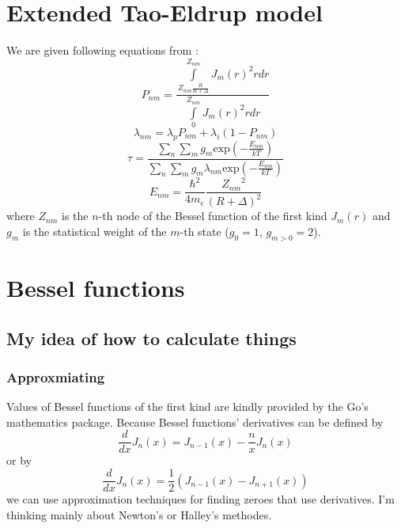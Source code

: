 \documentclass[a4paper]{article}
\begin{document}
	\section{Extended Tao-Eldrup model}
	We are given following equations from \cite{Zaleski2015}:
	\begin{equation}
		\label{eq1}
		P_{nm} = 
			\frac
				{\int\limits_{Z_{nm}\frac{R}{R+\Delta}}^{Z_{nm}}J_m(r)^2rdr}
				{\int\limits_0^{Z_{nm}}J_m(r)^2rdr}
	\end{equation}
	\begin{equation}
		\lambda_{nm} = \lambda_pP_{nm} + \lambda_i(1-P_{nm})
	\end{equation}
	\begin{equation}
		\tau =
			\frac
				{\sum\limits_n\sum\limits_mg_m\mathrm{exp}\left(-\frac{E_{nm}}{kT}\right)}
				{\sum\limits_n\sum\limits_mg_m\lambda_{nm}\mathrm{exp}\left(-\frac{E_{nm}}{kT}\right)}
	\end{equation}
	\begin{equation*}
		E_{nm} = \frac{\hbar^2}{4m_e}\frac{{Z_{nm}}^2}{(R+\Delta)^2}
	\end{equation*}
	where $Z_{nm}$ is the $n$-th node of the Bessel function of the
	first kind $J_m(r)$ and $g_m$ is the statistical weight of the $m$-th state
	($g_0 = 1$, $g_{m>0}=2$).
	\section{Bessel functions}
	\subsection{My idea of how to calculate things}
	\subsubsection{Approxmiating}
	Values of Bessel functions of the first kind are
	kindly provided by the Go's mathematics package.
	Because Bessel functions' derivatives can be defined by 
	\begin{equation*}
		\frac{d}{dx}J_n(x) = J_{n-1}(x) - \frac{n}{x}J_n(x)
	\end{equation*}
	or by
	\begin{equation*}
		\frac{d}{dx}J_n(x) = \frac{1}{2}(J_{n-1}(x) - J_{n+1}(x))
	\end{equation*}
	we can use approximation techniques for finding zeroes that use derivatives.
	I'm thinking mainly about Newton's or Halley's methodes.
\end{document}
